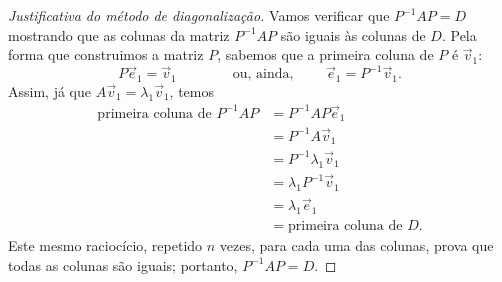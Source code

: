 \begin{proof}[Justificativa do método de diagonalização]
Vamos verificar que $P^{-1} A P = D$ mostrando que as colunas da matriz $P^{-1} A P$ são iguais às colunas de $D$. Pela forma que construimos a matriz $P$, sabemos que a primeira coluna de $P$ é $\vec{v}_1$:
\begin{equation}
P \vec{e}_1 = \vec{v}_1 \qquad \qquad \text{ou, ainda, } \qquad  \vec{e}_1 = P^{-1} \vec{v}_1.
\end{equation} Assim, já que $A \vec{v}_1 = \lambda_1 \vec{v}_1$, temos
\begin{equation}
\begin{split}
\text{primeira coluna de } P^{-1} A P  & = P^{-1} A P \vec{e}_1 \\
                                       & = P^{-1} A \vec{v}_1 \\
                                       & = P^{-1} \lambda_1 \vec{v}_1 \\
                                       & = \lambda_1 P^{-1} \vec{v}_1 \\
                                       & = \lambda_1 \vec{e}_1 \\
                                       & = \text{primeira coluna de } D.
\end{split}
\end{equation}
Este mesmo raciocício, repetido $n$ vezes, para cada uma das colunas, prova que todas as colunas são iguais; portanto, $P^{-1} A P = D$.
\end{proof}

